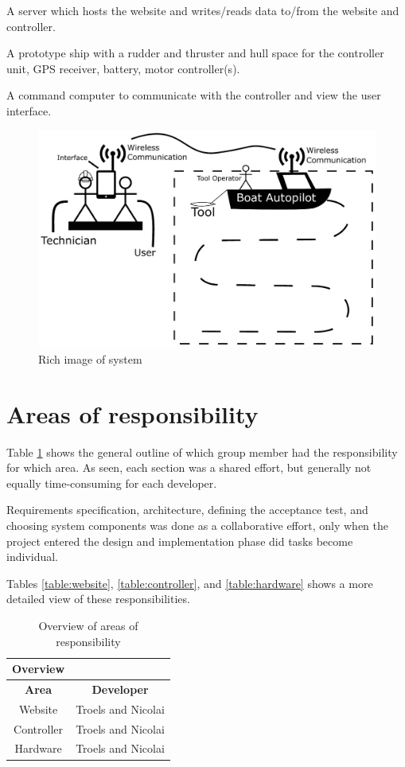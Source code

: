 A server which hosts the website and writes/reads data to/from the website and controller.

A prototype ship with a rudder and thruster and hull space for the controller unit, GPS receiver, battery, motor controller(s).

A command computer to communicate with the controller and view the user interface.

\begin{figure}[H]
	\centering
	\includegraphics[width=1\linewidth]{rich_image}
	\caption{Rich image of system}
	\label{table:rich_image}
\end{figure}

\section{Areas of responsibility}
Table \ref{table:overview} shows the general outline of which group member had the responsibility for which area. As seen, each section was a shared effort, but generally not equally time-consuming for each developer.

Requirements specification, architecture, defining the acceptance test, and choosing system components was done as a collaborative effort, only when the project entered the design and implementation phase did tasks become individual. 

Tables \ref{table:website}, \ref{table:controller}, and \ref{table:hardware} shows a more detailed view of these responsibilities.

\begin{table}[H]
\centering
\begin{tabular}{|c|c|}
\hline 
\textbf{Overview} & \\ 
\hline 
\textbf{Area} & \textbf{Developer} \\ 
\hline 
Website & Troels and Nicolai \\ 
\hline 
Controller & Troels and Nicolai \\ 
\hline 
Hardware & Troels and Nicolai \\ 
\hline 
\end{tabular} 
\caption{Overview of areas of responsibility}
\label{table:overview}
\end{table}

